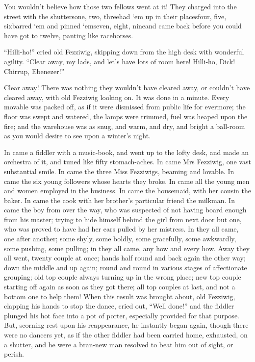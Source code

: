 \documentclass[paper=5.5in:8.5in,BCOR=5mm,twoside,DIV=calc,12pt,usegeometry]{scrbook} %
\begin{document}
You wouldn't believe how those two fellows went at it! They charged into the street with the shutters\textemdash one, two, three\textemdash had `em up in their places\textemdash four, five, six\textemdash barred `em and pinned `em\textemdash seven, eight, nine\textemdash and came back before you could have got to twelve, panting like racehorses.

\enquote{Hilli-ho!} cried old Fezziwig, skipping down from the high desk with wonderful agility. \enquote{Clear away, my lads, and let's have lots of room here! Hilli-ho, Dick! Chirrup, Ebenezer!}

Clear away! There was nothing they wouldn't have cleared away, or couldn't have cleared away, with old Fezziwig looking on. It was done in a minute. Every movable was packed off, as if it were dismissed from public life for evermore; the floor was swept and watered, the lamps were trimmed, fuel was heaped upon the fire; and the warehouse was as snug, and warm, and dry, and bright a ball-room as you would desire to see upon a winter's night.

In came a fiddler with a music-book, and went up to the lofty desk, and made an orchestra of it, and tuned like fifty stomach-aches. In came Mrs Fezziwig, one vast substantial smile. In came the three Miss Fezziwigs, beaming and lovable. In came the six young followers whose hearts they broke. In came all the young men and women employed in the business. In came the housemaid, with her cousin the baker. In came the cook with her brother's particular friend the milkman. In came the boy from over the way, who was suspected of not having board enough from his master; trying to hide himself behind the girl from next door but one, who was proved to have had her ears pulled by her mistress. In they all came, one after another; some shyly, some boldly, some gracefully, some awkwardly, some pushing, some pulling; in they all came, any how and every how. Away they all went, twenty couple at once; hands half round and back again the other way; down the middle and up again; round and round in various stages of affectionate grouping; old top couple always turning up in the wrong place; new top couple starting off again as soon as they got there; all top couples at last, and not a bottom one to help them! When this result was brought about, old Fezziwig, clapping his hands to stop the dance, cried out, \enquote{Well done!} and the fiddler plunged his hot face into a pot of porter, especially provided for that purpose. But, scorning rest upon his reappearance, he instantly began again, though there were no dancers yet, as if the other fiddler had been carried home, exhausted, on a shutter, and he were a bran-new man resolved to beat him out of sight, or perish.
\end{document}
